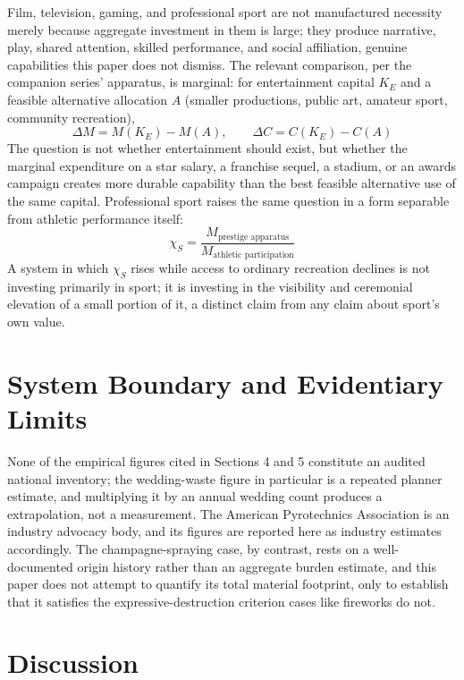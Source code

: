 \documentclass[11pt]{article}
\begin{document}
Film, television, gaming, and professional sport are not manufactured necessity merely because aggregate investment in them is large; they produce narrative, play, shared attention, skilled performance, and social affiliation, genuine capabilities this paper does not dismiss. The relevant comparison, per the companion series' apparatus, is marginal: for entertainment capital $K_E$ and a feasible alternative allocation $A$ (smaller productions, public art, amateur sport, community recreation),
\[
\Delta M = M(K_E) - M(A), \qquad \Delta C = C(K_E) - C(A)
\]
The question is not whether entertainment should exist, but whether the marginal expenditure on a star salary, a franchise sequel, a stadium, or an awards campaign creates more durable capability than the best feasible alternative use of the same capital. Professional sport raises the same question in a form separable from athletic performance itself:
\[
\chi_S = \frac{M_{\text{prestige apparatus}}}{M_{\text{athletic participation}}}
\]
A system in which $\chi_S$ rises while access to ordinary recreation declines is not investing primarily in sport; it is investing in the visibility and ceremonial elevation of a small portion of it, a distinct claim from any claim about sport's own value.

\section{System Boundary and Evidentiary Limits}

None of the empirical figures cited in Sections 4 and 5 constitute an audited national inventory; the wedding-waste figure in particular is a repeated planner estimate, and multiplying it by an annual wedding count produces a extrapolation, not a measurement. The American Pyrotechnics Association is an industry advocacy body, and its figures are reported here as industry estimates accordingly. The champagne-spraying case, by contrast, rests on a well-documented origin history rather than an aggregate burden estimate, and this paper does not attempt to quantify its total material footprint, only to establish that it satisfies the expressive-destruction criterion cases like fireworks do not.

\section{Discussion}
\end{document}
